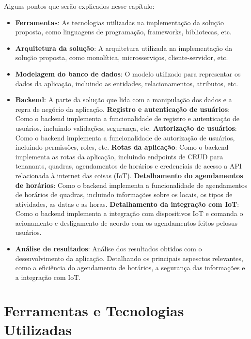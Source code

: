 Alguns pontos que serão explicados nesse capítulo:

\begin{itemize}
	\item \textbf{Ferramentas}: As tecnologias utilizadas na implementação da solução proposta, como linguagens de programação, frameworks, bibliotecas, etc.
	\item \textbf{Arquitetura da solução}: A arquitetura utilizada na implementação da solução proposta, como monolítica, microsserviços, cliente-servidor, etc.
	\item \textbf{Modelagem do banco de dados}: O modelo utilizado para representar os dados da aplicação, incluindo as entidades, relacionamentos, atributos, etc.
	\item \textbf{Backend}: A parte da solução que lida com a manipulação dos dados e a regra de negócio da aplicação.
	\subitem \textbf{Registro e autenticação de usuários}: Como o backend implementa a funcionalidade de registro e autenticação de usuários, incluindo validações, segurança, etc.
	\subitem \textbf{Autorização de usuários}: Como o backend implementa a funcionalidade de autorização de usuários, incluindo permissões, roles, etc.
	\subitem \textbf{Rotas da aplicação}: Como o backend implementa as rotas da aplicação, incluindo endpoints de CRUD para tenanants, quadras, agendamentos de horários e credenciais de acesso a API relacionada à internet das coisas (IoT).
	\subitem \textbf{Detalhamento do agendamentos de horários}: Como o backend implementa a funcionalidade de agendamentos de horários de quadras, incluindo informações sobre os locais, os tipos de atividades, as datas e as horas.
	\subitem \textbf{Detalhamento da integração com IoT}: Como o backend implementa a integração com dispositivos IoT e comanda o acionamento e desligamento de acordo com os agendamentos feitos pelosus usuários.
	\item \textbf{Análise de resultados}: Análise dos resultados obtidos com o desenvolvimento da aplicação. Detalhando os principais aspesctos relevantes, como a eficiência do agendamento de horários, a segurança das informações e a integração com IoT.
\end{itemize}

\section{Ferramentas e Tecnologias Utilizadas}\label{sec:ferramentas_tecnologias}

